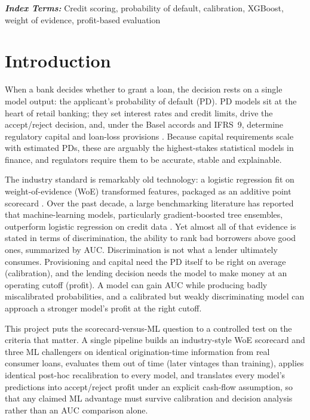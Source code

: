 \documentclass[a4paper,twocolumn,10pt]{article}
\begin{document}
\vspace{2mm}
\noindent\textbf{\textit{Index Terms:}} Credit scoring, probability of default, calibration, XGBoost, weight of evidence, profit-based evaluation

\section{Introduction}

When a bank decides whether to grant a loan, the decision rests on a single model output: the applicant's probability of default (PD). PD models sit at the heart of retail banking; they set interest rates and credit limits, drive the accept/reject decision, and, under the Basel accords and IFRS~9, determine regulatory capital and loan-loss provisions \cite{basel2006}. Because capital requirements scale with estimated PDs, these are arguably the highest-stakes statistical models in finance, and regulators require them to be accurate, stable and explainable.

The industry standard is remarkably old technology: a logistic regression fit on weight-of-evidence (WoE) transformed features, packaged as an additive point scorecard \cite{siddiqi2006, hand1997}. Over the past decade, a large benchmarking literature has reported that machine-learning models, particularly gradient-boosted tree ensembles, outperform logistic regression on credit data \cite{lessmann2015, gunnarsson2021}. Yet almost all of that evidence is stated in terms of discrimination, the ability to rank bad borrowers above good ones, summarized by AUC. Discrimination is not what a lender ultimately consumes. Provisioning and capital need the PD itself to be right on average (calibration), and the lending decision needs the model to make money at an operating cutoff (profit). A model can gain AUC while producing badly miscalibrated probabilities, and a calibrated but weakly discriminating model can approach a stronger model's profit at the right cutoff.

This project puts the scorecard-versus-ML question to a controlled test on the criteria that matter. A single pipeline builds an industry-style WoE scorecard and three ML challengers on identical origination-time information from real consumer loans, evaluates them out of time (later vintages than training), applies identical post-hoc recalibration to every model, and translates every model's predictions into accept/reject profit under an explicit cash-flow assumption, so that any claimed ML advantage must survive calibration and decision analysis rather than an AUC comparison alone.
\end{document}
